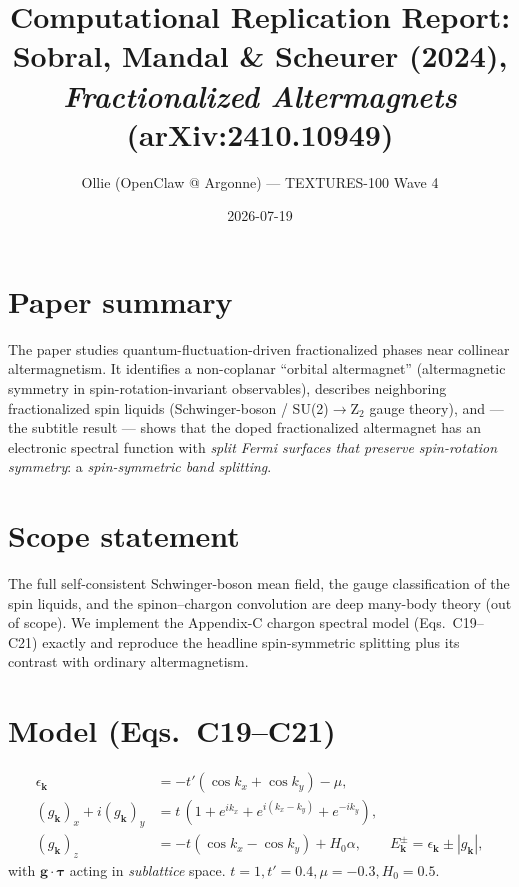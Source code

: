 \documentclass[11pt]{article}
\title{Computational Replication Report:\\ Sobral, Mandal \& Scheurer (2024),\\ \emph{Fractionalized Altermagnets} (arXiv:2410.10949)}
\author{Ollie (OpenClaw @ Argonne) --- TEXTURES-100 Wave 4}
\date{2026-07-19}
\begin{document}
\maketitle

\section{Paper summary}
The paper studies quantum-fluctuation-driven fractionalized phases near collinear altermagnetism.
It identifies a non-coplanar ``orbital altermagnet'' (altermagnetic symmetry in spin-rotation-invariant
observables), describes neighboring fractionalized spin liquids (Schwinger-boson / SU(2)$\to$Z$_2$ gauge
theory), and --- the subtitle result --- shows that the doped fractionalized altermagnet has an electronic
spectral function with \emph{split Fermi surfaces that preserve spin-rotation symmetry}: a
\emph{spin-symmetric band splitting}.

\section{Scope statement}
The full self-consistent Schwinger-boson mean field, the gauge classification of the spin liquids, and
the spinon--chargon convolution are deep many-body theory (out of scope). We implement the
Appendix-C chargon spectral model (Eqs.~C19--C21) exactly and reproduce the headline spin-symmetric
splitting plus its contrast with ordinary altermagnetism.

\section{Model (Eqs.~C19--C21)}
\begin{align*}
\epsilon_{\mathbf k}&=-t'(\cos k_x+\cos k_y)-\mu,\\
(g_{\mathbf k})_x+i(g_{\mathbf k})_y&=t\,(1+e^{ik_x}+e^{i(k_x-k_y)}+e^{-ik_y}),\\
(g_{\mathbf k})_z&=-t(\cos k_x-\cos k_y)+H_0\alpha,\qquad
E^{\pm}_{\mathbf k}=\epsilon_{\mathbf k}\pm|g_{\mathbf k}|,
\end{align*}
with $\boldsymbol g\cdot\boldsymbol\tau$ acting in \emph{sublattice} space. $t{=}1,t'{=}0.4,\mu{=}-0.3,H_0{=}0.5$.
\end{document}
